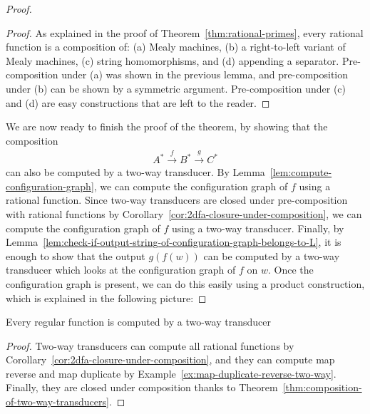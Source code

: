 \begin{proof}
    \begin{proof}
        As explained in the proof of Theorem~\ref{thm:rational-primes}, every rational function is a composition of: (a) Mealy machines, (b) a right-to-left variant of Mealy machines, (c) string homomorphisms, and (d) appending a separator. Pre-composition under (a) was shown in the previous lemma, and pre-composition under (b) can be shown by a symmetric argument. Pre-composition under (c) and (d) are easy constructions that are left to the reader. 
    \end{proof}

    We are now ready to finish the proof of the theorem, by showing that the composition 
    \begin{align*}
     A^* \xrightarrow f B^* \xrightarrow g C^*
    \end{align*}
    can also be computed by a two-way transducer. By Lemma~\ref{lem:compute-configuration-graph}, we can compute the configuration graph of $f$ using a rational function. Since two-way transducers are closed under pre-composition with rational functions by Corollary~\ref{cor:2dfa-closure-under-composition}, we can compute the configuration graph of $f$ using a two-way transducer. Finally, by Lemma~\ref{lem:check-if-output-string-of-configuration-graph-belongs-to-L}, it is enough to show that the output $g(f(w))$ can be computed by a two-way transducer which looks at the configuration graph of $f$ on $w$. Once the configuration graph is present, we can do this easily using a product construction, which is explained in the following picture:
\end{proof}
 
 

\begin{corollary}\label{cor:2dfa-computes-all-regular-functions}
    Every regular function  is computed by a two-way transducer
\end{corollary}

\begin{proof}
    Two-way transducers can compute all rational functions by Corollary~\ref{cor:2dfa-closure-under-composition}, and they can compute  map reverse and map duplicate by Example~\ref{ex:map-duplicate-reverse-two-way}. Finally, they are closed under composition thanks to Theorem~\ref{thm:composition-of-two-way-transducers}.
\end{proof}



